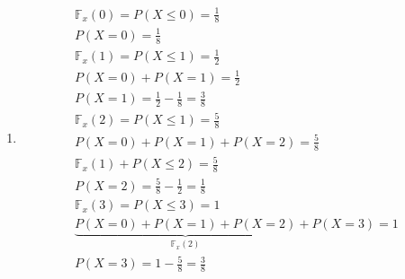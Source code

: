 \documentclass[11pt,a4paper]{book}
\begin{document}
\begin{description}
\begin{enumerate}[label= (\alph*)]
       \item
         \begin{align*}
           \mathbb{F}_{x}(0)= P(X \le 0)= \frac{1}{8}\\
           P(X=0)= \frac{1}{8}\\
           \mathbb{F}_{x}(1)= P(X \le 1)= \frac{1}{2}\\
           P(X=0)+P(X=1)= \frac{1}{2} \\
           P(X=1)= \frac{1}{2}- \frac{1}{8}= \frac{3}{8}\\
           \mathbb{F}_{x}(2)= P(X \le 1)= \frac{5}{8}\\
           P(X=0)+P(X=1)+P(X=2)= \frac{5}{8}\\
           \mathbb{F}_{x} (1) + P(X \le 2 )=\frac{5}{8}\\
           P(X=2)= \frac{5}{8}- \frac{1}{2}= \frac{1}{8}\\
           \mathbb{F}_{x}(3)= P(X \le 3)= 1\\
           \underbrace{P(X=0)+ P(X=1)+ P(X=2)}_{\mathbb{F}_{x}(2)} + P(X=3)=1\\
           P(X =3) = 1- \frac{5}{8}= \frac{3}{8}
         \end{align*}
     \end{enumerate}
 \end{description}
\end{document}
